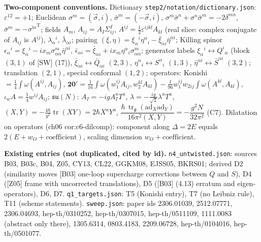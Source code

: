 \documentclass[11pt]{article}
\theoremstyle{definition}
\newcommand{\tr}{\operatorname{tr}}
\newcommand{\unit}{\dfrac{\hbar\,\tr_{\mathfrak g}(\mathrm{ad}_X\mathrm{ad}_Y)}{16\pi^2(X,Y)}}
\begin{document}
\textbf{Two-component conventions.} Dictionary \texttt{step2/notation/dictionary.json}: $\varepsilon^{12}=+1$; Euclidean $\sigma^m=(\vec\sigma,i)$, $\bar\sigma^m=(-\vec\sigma,i)$, $\sigma^m\bar\sigma^n+\sigma^n\bar\sigma^m=-2\delta^{mn}$, $\bar\sigma^m=-\overline{\sigma^m}^{\mathrm T}$; fields $A_m$, $A_{ij}=A_I\Sigma^I_{ij}$, $A^{ij}=\tfrac12\varepsilon^{ijkl}A_{kl}$ (real slice: complex conjugate of $A_{ij}$ is $A^{ij}$), $\lambda_\alpha{}^i$, $\bar\lambda_{\dot\alpha i}$; pairing $(\xi,\eta)=\xi_\alpha{}^i\eta^\alpha{}_i-\bar\xi_{\dot\alpha i}\bar\eta^{\dot\alpha i}$; Killing spinor $\epsilon_\alpha{}^i=\xi_\alpha{}^i-ix_m\sigma^m_{\alpha\dot\alpha}\bar\eta^{\dot\alpha i}$, $\bar\epsilon_{\dot\alpha i}=\bar\xi_{\dot\alpha i}+ix_m\eta^\alpha{}_i\sigma^m_{\alpha\dot\alpha}$; generator labels $\xi_\alpha{}^i\leftrightarrow Q^i{}_\alpha$ (block $(3,1)$ of [SW] (17)), $\bar\xi_{\dot\alpha i}\leftrightarrow\bar Q_{\dot\alpha i}$ $(2,3)$, $\eta^\alpha{}_i\leftrightarrow S^\alpha{}_i$ $(1,3)$, $\bar\eta^{\dot\alpha i}\leftrightarrow\bar S^{\dot\alpha i}$ $(3,2)$; translation $(2,1)$, special conformal $(1,2)$; operators: Konishi $=\tfrac14\int\omega(A^{ij},A_{ij})$, $\mathbf{20'}=\tfrac1{16}\int\omega(w_1^{ij}A_{ij},w_2^{kl}A_{kl})-\tfrac1{96}w_1^{ij}w_{2ij}\int\omega(A^{kl},A_{kl})$, $\iota_wA=\tfrac14w^{ij}A_{ij}$; $\mathfrak{su}(N)$: $A_I=-igA^a_IT^a$, $\lambda=-\tfrac{ig}{\sqrt2}\lambda^aT^a$, $(X,Y)=-\tfrac{4\hbar}{g^2}\tr(XY)=2\hbar X^aY^a$, $\unit=-\dfrac{g^2N}{32\pi^2}$ (C7). Dilatation on operators (ch06 cor:c6-dilcomp): component along $\Delta=2E$ equals $2(E+w_O+\text{coefficient})$, scaling dimension $w_O+\text{coefficient}$.

\textbf{Existing entries (not duplicated, cited by id).} \texttt{n4\_untwisted.json}: sources B03, B03c, B04, Z05, CY13, CL22, GGKM08, EJSS05, BKRS01; derived D2 (similarity moves [B03] one-loop supercharge corrections between $Q$ and $S$), D4 ([Z05] frame with uncorrected translations), D5 ([B03] (4.13) erratum and eigen-operators), D6, D7. \texttt{q1\_targets.json}: T5 (Konishi entry), T7 (no Leibniz rule), T11 (scheme statements). \texttt{sweep.json}: paper ids 2306.01039, 2512.07771, 2306.04693, hep-th/0310252, hep-th/0307015, hep-th/0511109, 1111.0083 (abstract only there), 1305.6314, 0803.4183, 2209.06728, hep-th/0104016, hep-th/0501077.
\end{document}
